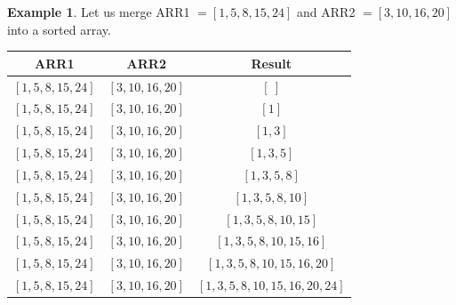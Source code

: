 \documentclass[10pt, a4paper]{extarticle}
\theoremstyle{definition}
\newtheorem{eg}{Example}
\begin{document}
\begin{eg}
	Let us merge ARR1 $=[1,5,8,15,24]$ and ARR2 $=[3,10,16,20]$ into a sorted array.
	\begin{center}
		\begin{tabular}{|c|c|c|}
			\hline
			ARR1                    & ARR2                   & Result                     \\
			\hline
			$[\boxed{1},5,8,15,24]$ & $[\boxed{3},10,16,20]$ & $[\ ]$                     \\
			\hline
			$[1,\boxed{5},8,15,24]$ & $[\boxed{3},10,16,20]$ & $[1]$                      \\
			\hline
			$[1,\boxed{5},8,15,24]$ & $[3,\boxed{10},16,20]$ & $[1,3]$                    \\
			\hline
			$[1,5,\boxed{8},15,24]$ & $[3,\boxed{10},16,20]$ & $[1,3,5]$                  \\
			\hline
			$[1,5,8,\boxed{15},24]$ & $[3,\boxed{10},16,20]$ & $[1,3,5,8]$                \\
			\hline
			$[1,5,8,\boxed{15},24]$ & $[3,10,\boxed{16},20]$ & $[1,3,5,8,10]$             \\
			\hline
			$[1,5,8,15,\boxed{24}]$ & $[3,10,\boxed{16},20]$ & $[1,3,5,8,10,15]$          \\
			\hline
			$[1,5,8,15,\boxed{24}]$ & $[3,10,16,\boxed{20}]$ & $[1,3,5,8,10,15,16]$       \\
			\hline
			$[1,5,8,15,\boxed{24}]$ & $[3,10,16,20]$         & $[1,3,5,8,10,15,16,20]$    \\
			\hline
			$[1,5,8,15,24]$         & $[3,10,16,20]$         & $[1,3,5,8,10,15,16,20,24]$ \\
			\hline
		\end{tabular}
	\end{center}
\end{eg}
\end{document}

